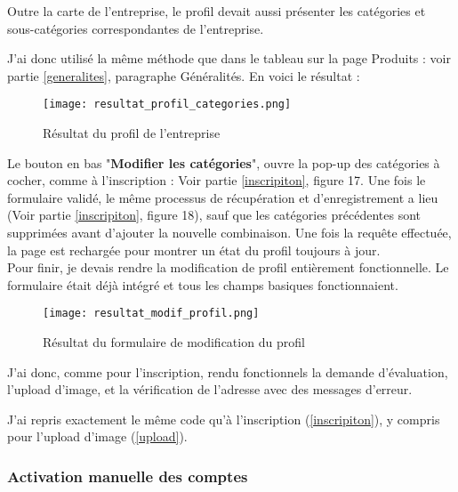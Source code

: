 
Outre la carte de l'entreprise, le profil devait aussi présenter les catégories et sous-catégories correspondantes de l'entreprise.

J'ai donc utilisé la même méthode que dans le tableau sur la page Produits : voir partie \ref{generalites}, paragraphe Généralités. En voici le résultat :

\begin{figure}[H]
    \texttt{[image: resultat\_profil\_categories.png]}
    \caption{Résultat du profil de l'entreprise}
\end{figure}


Le bouton en bas "\textbf{Modifier les catégories}", ouvre la pop-up des catégories à cocher, comme à l'inscription : Voir partie \ref{inscripiton}, figure 17.
Une fois le formulaire validé, le même processus de récupération et d'enregistrement a lieu (Voir partie \ref{inscripiton}, figure 18), sauf que les catégories précédentes sont supprimées avant d'ajouter la nouvelle combinaison.
Une fois la requête effectuée, la page est rechargée pour montrer un état du profil toujours à jour.\\


Pour finir, je devais rendre la modification de profil entièrement fonctionnelle. Le formulaire était déjà intégré et tous les champs basiques fonctionnaient.

\begin{figure}[H]
    \texttt{[image: resultat\_modif\_profil.png]}
    \caption{Résultat du formulaire de modification du profil}
\end{figure}

J'ai donc, comme pour l'inscription, rendu fonctionnels la demande d'évaluation, l'upload d'image, et la vérification de l'adresse avec des messages d'erreur.

J'ai repris exactement le même code qu'à l'inscription (\ref{inscripiton}), y compris pour l'upload d'image (\ref{upload}). 

\subsubsection{Activation manuelle des comptes}

